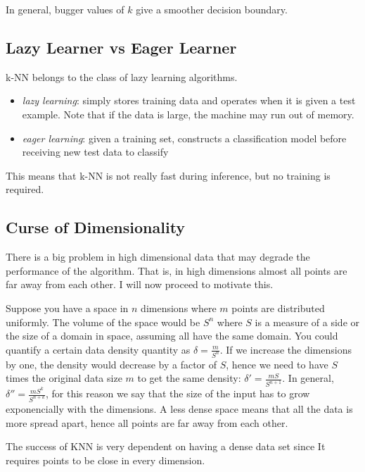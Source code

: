 \documentclass[11pt]{article}
\begin{document}
In general, bugger values of \(k\) give a smoother decision boundary.

\subsection{Lazy Learner vs Eager
Learner}\label{lazy-learner-vs-eager-learner}

k-NN belongs to the class of lazy learning algorithms.

\begin{itemize}
\tightlist
\item
  \emph{lazy learning}: simply stores training data and operates when it
  is given a test example. Note that if the data is large, the machine
  may run out of memory.
\item
  \emph{eager learning}: given a training set, constructs a
  classification model before receiving new test data to classify
\end{itemize}

This means that k-NN is not really fast during inference, but no
training is required.

\subsection{Curse of Dimensionality}\label{curse-of-dimensionality}

There is a big problem in high dimensional data that may degrade the
performance of the algorithm. That is, in high dimensions almost all
points are far away from each other. I will now proceed to motivate
this.

Suppose you have a space in \(n\) dimensions where \(m\) points are
distributed uniformly. The volume of the space would be \(S^n\) where
\(S\) is a measure of a side or the size of a domain in space, assuming
all have the same domain. You could quantify a certain data density
quantity as \(\delta = \frac{m}{S^n}\). If we increase the dimensions by
one, the density would decrease by a factor of \(S\), hence we need to
have \(S\) times the original data size \(m\) to get the same density:
\(\delta' = \frac{mS}{S^{n+1}}\). In general,
\(\delta''=\frac{mS^k}{S^{n+k}}\), for this reason we say that the size
of the input has to grow exponencially with the dimensions. A less dense
space means that all the data is more spread apart, hence all points are
far away from each other.

The success of KNN is very dependent on having a dense data set since It
requires points to be close in every dimension.
\end{document}

